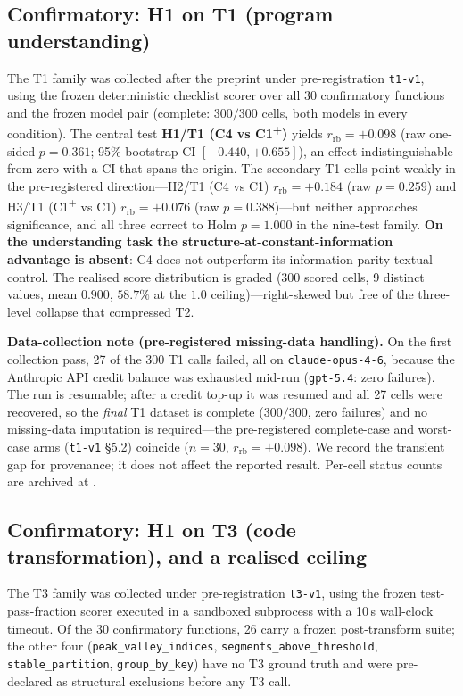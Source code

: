 \documentclass[11pt]{article}
\begin{document}
\subsection{Confirmatory: H1 on T1 (program understanding)}
\label{sec:4.2b}
The T1 family was collected after the preprint under pre-registration
\texttt{t1-v1}, using the frozen deterministic checklist scorer
over all 30 confirmatory functions and the frozen model pair
(complete: $300/300$ cells, both models in every condition). The
central test \textbf{H1/T1 (C4 vs C1\textsuperscript{+})} yields
$r_{\text{rb}} = +0.098$ (raw one-sided $p = 0.361$; 95\% bootstrap CI
$[-0.440, +0.655]$), an effect indistinguishable from zero with a CI that
spans the origin. The secondary T1 cells point weakly in the
pre-registered direction---H2/T1 (C4 vs C1) $r_{\text{rb}} = +0.184$ (raw
$p = 0.259$) and H3/T1 (C1\textsuperscript{+} vs C1) $r_{\text{rb}} =
+0.076$ (raw $p = 0.388$)---but neither approaches significance, and all
three correct to Holm $p = 1.000$ in the nine-test family. \textbf{On the
understanding task the structure-at-constant-information advantage is
absent}: C4 does not outperform its information-parity textual control.
The realised score distribution is graded (300 scored cells, 9 distinct
values, mean $0.900$, $58.7\%$ at the $1.0$ ceiling)---right-skewed but
free of the three-level collapse that compressed T2.

\textbf{Data-collection note (pre-registered missing-data handling).}
On the first collection pass, 27 of the 300 T1 calls failed, all on
\texttt{claude-opus-4-6}, because the Anthropic API credit balance was
exhausted mid-run (\texttt{gpt-5.4}: zero failures). The run is resumable;
after a credit top-up it was resumed and all 27 cells were recovered, so
the \emph{final} T1 dataset is complete ($300/300$, zero failures) and no
missing-data imputation is required---the pre-registered complete-case and
worst-case arms (\texttt{t1-v1} \S5.2) coincide ($n = 30$, $r_{\text{rb}} =
+0.098$). We record the transient gap for provenance; it does not affect
the reported result. Per-cell status counts are archived at
.

\subsection{Confirmatory: H1 on T3 (code transformation), and a realised ceiling}
\label{sec:4.2c}
The T3 family was collected under pre-registration \texttt{t3-v1},
using the frozen test-pass-fraction scorer executed in a sandboxed
subprocess with a 10\,s wall-clock timeout. Of the 30 confirmatory
functions, 26 carry a frozen post-transform suite; the other four
(\texttt{peak\_valley\_indices}, \texttt{segments\_above\_threshold},
\texttt{stable\_partition}, \texttt{group\_by\_key}) have no T3 ground
truth and were pre-declared as structural exclusions before any T3 call.
\end{document}
